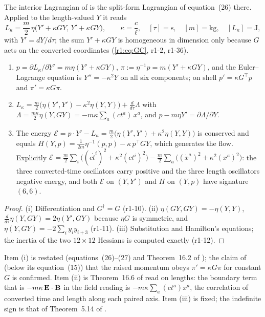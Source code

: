The interior Lagrangian of \cite{ES17} is the split-form Lagrangian of equation~(26) there. Applied to the length-valued $Y$ it reads
\begin{equation}
\label{r1:eq:Lkappa}
L_\kappa=\frac m2\,\eta\bigl(Y'+\kappa GY,\,Y'+\kappa GY\bigr),\qquad \kappa=\frac c\ell,\quad [\tau]=\mathrm s,\quad [m]=\mathrm{kg},\quad [L_\kappa]=\mathrm J,
\end{equation}
with $Y'=dY/d\tau$; the sum $Y'+\kappa GY$ is homogeneous in dimension only because $G$ acts on the converted coordinates (\eqref{r1:eq:GC},
r1-2, r1-36).

\begin{proposition}
\label{r1:prop:shift}
\begin{enumerate}[label=(\roman*),leftmargin=2.2em]
\item $p=\partial L_\kappa/\partial Y'=m\eta(Y'+\kappa GY)$, $\pi:=\eta^{-1}p=m(Y'+\kappa GY)$, and the Euler--Lagrange equation is
$Y''=-\kappa^2Y$ on all six components; on shell $p'=\kappa G^{\!\top}p$ and $\pi'=\kappa G\pi$.
\item $L_\kappa=\tfrac m2\bigl(\eta(Y',Y')-\kappa^2\eta(Y,Y)\bigr)+\tfrac{d}{d\tau}\Lambda$ with
$\Lambda=\tfrac{m\kappa}2\eta(Y,GY)=-m\kappa\sum_a(ct^a)\,x^a$, and $p-m\eta Y'=\partial\Lambda/\partial Y$.
\item The energy $\mathcal E=p\cdot Y'-L_\kappa=\tfrac m2\bigl(\eta(Y',Y')+\kappa^2\eta(Y,Y)\bigr)$ is conserved and equals
$H(Y,p)=\tfrac1{2m}\eta^{-1}(p,p)-\kappa\,p^{\!\top}GY$, which generates the flow. Explicitly
$\mathcal E=\tfrac m2\sum_i\bigl((c\dot t^i)^2+\kappa^2(ct^i)^2\bigr)-\tfrac m2\sum_a\bigl((\dot x^a)^2+\kappa^2(x^a)^2\bigr)$: the
three converted-time oscillators carry positive and the three length oscillators negative energy, and both $\mathcal E$ on $(Y,Y')$ and
$H$ on $(Y,p)$ have signature $(6,6)$.
\end{enumerate}
\end{proposition}

\begin{proof}
(i) Differentiation and $G^\dagger=G$ (r1-10). (ii) $\eta(GY,GY)=-\eta(Y,Y)$, $\tfrac{d}{d\tau}\eta(Y,GY)=2\eta(Y',GY)$ because $\eta G$ is
symmetric, and $\eta(Y,GY)=-2\sum_iy_iy_{i+3}$ (r1-11). (iii) Substitution and Hamilton's equations; the inertia of the two $12\times12$
Hessians is computed exactly (r1-12).
\end{proof}

Item (i) is restated (equations~(26)--(27) and Theorem~16.2 of \cite{ES17}); the claim of \cite{FMB} (below its equation~(15)) that the
raised momentum obeys $\pi'=\kappa G\pi$ for constant $G$ is confirmed. Item (ii) is Theorem~16.6 of \cite{ES17} read on lengths: the
boundary term that is $-m\kappa\,\mathbf E\cdot\mathbf B$ in the field reading is $-m\kappa\sum_a(ct^a)x^a$, the correlation of converted time and
length along each paired axis. Item (iii) is fixed; the indefinite sign is that of Theorem~5.14 of \cite{RE}.

